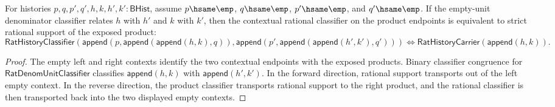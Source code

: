 \begin{theorem}
\label{thm:rat-denom-unit-classifier-contextual-product-rat-classifier-iff}
For histories \(p,q,p',q',h,k,h',k':\mathsf{BHist}\), assume
\(p\hsame\emp\), \(q\hsame\emp\), \(p'\hsame\emp\), and \(q'\hsame\emp\).
If the empty-unit denominator classifier relates \(h\) with \(h'\) and \(k\)
with \(k'\), then the contextual rational classifier on the product endpoints
is equivalent to strict rational support of the exposed product:
$$
\mathsf{RatHistoryClassifier}
  (\mathsf{append}(p,\mathsf{append}(\mathsf{append}(h,k),q)),
   \mathsf{append}(p',\mathsf{append}(\mathsf{append}(h',k'),q')))
\Longleftrightarrow
\mathsf{RatHistoryCarrier}(\mathsf{append}(h,k)).
$$
\end{theorem}
\begin{proof}
The empty left and right contexts identify the two contextual endpoints with
the exposed products. Binary classifier congruence for
\(\mathsf{RatDenomUnitClassifier}\) classifies
\(\mathsf{append}(h,k)\) with \(\mathsf{append}(h',k')\). In the forward
direction, rational support transports out of the left empty context. In the
reverse direction, the product classifier transports rational support to the
right product, and the rational classifier is then transported back into the
two displayed empty contexts.
\end{proof}

